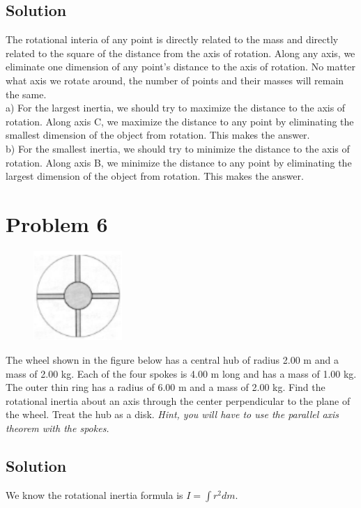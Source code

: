 \documentclass[12pt]{article}
\begin{document}
\subsection*{Solution}
The rotational interia of any point is directly related to the mass and directly related to the square of the distance from the axis of rotation. Along any axis, we eliminate one dimension of any point's distance to the axis of rotation. No matter what axis we rotate around, the number of points and their masses will remain the same.\\
a) For the largest inertia, we should try to maximize the distance to the axis of rotation. Along axis C, we maximize the distance to any point by eliminating the smallest dimension of the object from rotation. This makes  the answer.\\
b) For the smallest inertia, we should try to minimize the distance to the axis of rotation. Along axis B, we minimize the distance to any point by eliminating the largest dimension of the object from rotation. This makes  the answer.



\pagebreak
\section*{Problem 6}
\begin{figure}
    \vspace{-30pt}
    \includegraphics[width=0.30\textwidth]{graph_6.png} 
\end{figure}
The wheel shown in the figure below has a central hub of radius 2.00 m and a mass of 2.00
kg. Each of the four spokes is 4.00 m long and has a mass of 1.00 kg. The outer thin ring has a
radius of 6.00 m and a mass of 2.00 kg. Find the rotational inertia about an axis through the
center perpendicular to the plane of the wheel. Treat the hub as a disk. \textit{Hint, you will have to
use the parallel axis theorem with the spokes.}

\subsection*{Solution}
We know the rotational inertia formula is \(I = \int r^2 dm\).
\end{document}
